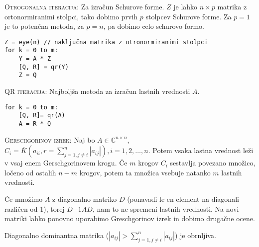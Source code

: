 \documentclass[a4paper,10pt]{article}
\theoremstyle{definition}
\def\C{\mathbb{C}}
\begin{document}
\textsc{Otrogonalna iteracija:} Za izračun Schurove forme. $Z$ je lahko $n\times
p$ matrika z ortonormiranimi stolpci, tako dobimo prvih $p$ stolpcev Schurove
forme. Za $p = 1$ je to potenčna metoda, za $p = n$, pa dobimo celo schurovo
formo.
\scriptsize
\begin{verbatim}
Z = eye(n) // naključna matrika z otronormiranimi stolpci
for k = 0 to m:
    Y = A * Z
    [Q, R] = qr(Y)
    Z = Q
\end{verbatim}
\normalsize

\textsc{QR iteracija:} Najboljša metoda za izračun lastnih vrednosti $A$.
\scriptsize
\begin{verbatim}
for k = 0 to m:
    [Q, R]= qr(A)
    A = R * Q
\end{verbatim}
\normalsize

\textsc{Gerschgorinov izrek:} Naj bo $A \in \C ^{n\times n}$, $C_i =
\overline{K}(a_{ii}, r=\sum_{j=1, j \neq i}^n | a_{ij}|), i=1,2,\ldots ,n$.
Potem vsaka lastna vrednost leži v vsaj enem Gerschgorinovem krogu. Če $m$
krogov $C_i$ sestavlja povezano množico, ločeno od ostalih $n-m$ krogov, potem
ta množica vsebuje natanko $m$ lastnih vrednosti.

Če množimo $A$ z diagonalno matriko $D$ (ponavadi le en element na diagonali
različen od 1), torej $D{-1}AD$, nam to ne spremeni lastnih vrednosti. Na novi
matriki lahko ponovno uporabimo Greschgorinov izrek in dobimo drugačne ocene.


Diagonalno dominantna matrika ($|a_{ij}| > \sum_{j=1, j\neq i}^n|a_{ij}|$) je obrnljiva.




%
\end{document}
